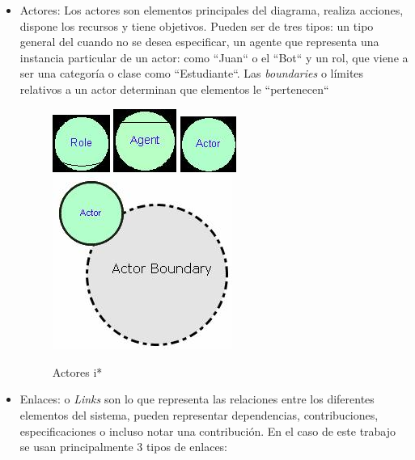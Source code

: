 \begin{itemize}
        \item Actores: Los actores son elementos principales del diagrama, realiza acciones, dispone los recursos y tiene objetivos. Pueden ser de tres tipos: un tipo general del cuando no se desea especificar, un agente que representa una instancia particular de un actor: como ``Juan`` o el ``Bot`` y un rol, que viene a ser una categoría o clase como ``Estudiante``. Las \textit{boundaries} o límites relativos a un actor determinan que elementos le ``pertenecen``
        \begin{figure}[h!]
            \centering
            \includegraphics[scale=0.4]{media/imagenes/i_star/sintaxis/role.jpg}
            \includegraphics[scale=0.4]{media/imagenes/i_star/sintaxis/agent.jpg}
            \includegraphics[scale=0.4]{media/imagenes/i_star/sintaxis/actor.jpg}
            \includegraphics[scale=0.4]{media/imagenes/i_star/sintaxis/actorboundary.jpg}
            \caption{Actores \gls{i*}}
        \end{figure}
        \item Enlaces: o \textit{Links} son lo que representa las relaciones entre los diferentes elementos del sistema, pueden representar dependencias, contribuciones, especificaciones o incluso notar una contribución. En el caso de este trabajo se usan principalmente 3 tipos de enlaces:

\end{itemize}
